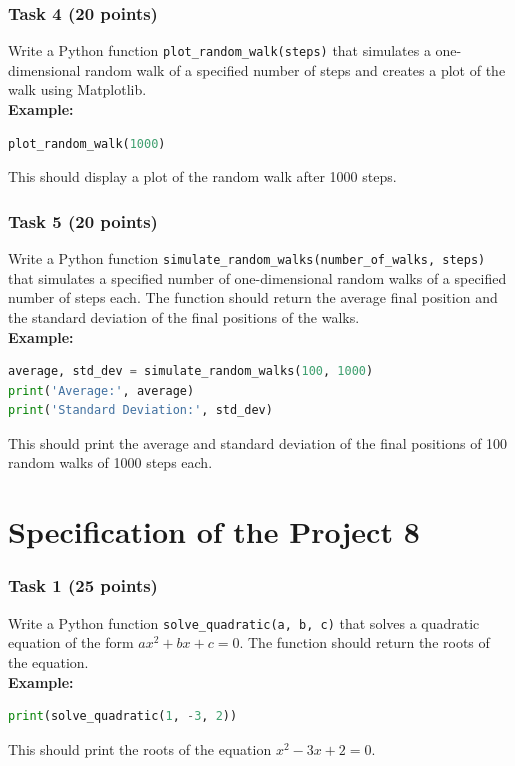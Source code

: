 \documentclass[12pt]{book}
\begin{document}
\subsubsection{Task 4 (20 points)}
Write a Python function \texttt{plot\_random\_walk(steps)} that simulates a one-dimensional random walk of a specified number of steps and creates a plot of the walk using Matplotlib. \\
\textbf{Example:}
\begin{lstlisting}[language=Python]
plot_random_walk(1000)
\end{lstlisting}
This should display a plot of the random walk after 1000 steps.

\subsubsection{Task 5 (20 points)}
Write a Python function \texttt{simulate\_random\_walks(number\_of\_walks, steps)} that simulates a specified number of one-dimensional random walks of a specified number of steps each. The function should return the average final position and the standard deviation of the final positions of the walks. \\
\textbf{Example:}
\begin{lstlisting}[language=Python]
average, std_dev = simulate_random_walks(100, 1000)
print('Average:', average)
print('Standard Deviation:', std_dev)
\end{lstlisting}
This should print the average and standard deviation of the final positions of 100 random walks of 1000 steps each.
\newpage
\section{Specification of the Project 8}

\subsubsection{Task 1 (25 points)}
Write a Python function \texttt{solve\_quadratic(a, b, c)} that solves a quadratic equation of the form $ax^2 + bx + c = 0$. The function should return the roots of the equation. \\
\textbf{Example:}
\begin{lstlisting}[language=Python]
print(solve_quadratic(1, -3, 2))
\end{lstlisting}
This should print the roots of the equation $x^2 - 3x + 2 = 0$.
\end{document}
